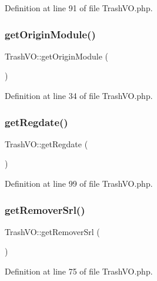 Definition at line 91 of file Trash\+V\+O.\+php.

\hypertarget{classTrashVO_af893f99474e0d6ec8f537fdf1a67e4b4}{}\label{classTrashVO_af893f99474e0d6ec8f537fdf1a67e4b4} 
\subsubsection{\texorpdfstring{get\+Origin\+Module()}{getOriginModule()}}
{\footnotesize\ttfamily Trash\+V\+O\+::get\+Origin\+Module (\begin{DoxyParamCaption}{ }\end{DoxyParamCaption})}



Definition at line 34 of file Trash\+V\+O.\+php.

\hypertarget{classTrashVO_ac7de0db59f33f9c3db7410cc54432c5b}{}\label{classTrashVO_ac7de0db59f33f9c3db7410cc54432c5b} 
\subsubsection{\texorpdfstring{get\+Regdate()}{getRegdate()}}
{\footnotesize\ttfamily Trash\+V\+O\+::get\+Regdate (\begin{DoxyParamCaption}{ }\end{DoxyParamCaption})}



Definition at line 99 of file Trash\+V\+O.\+php.

\hypertarget{classTrashVO_aefb79967cd30b4e805c889180f4c2329}{}\label{classTrashVO_aefb79967cd30b4e805c889180f4c2329} 
\subsubsection{\texorpdfstring{get\+Remover\+Srl()}{getRemoverSrl()}}
{\footnotesize\ttfamily Trash\+V\+O\+::get\+Remover\+Srl (\begin{DoxyParamCaption}{ }\end{DoxyParamCaption})}



Definition at line 75 of file Trash\+V\+O.\+php.

